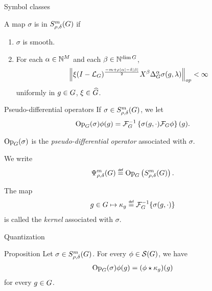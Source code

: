 \documentclass[handout]{beamer}
\begin{document}
\begin{frame}{Symbol classes}
    \begin{definition}
        A map $\sigma$ is in $S^{m}_{\rho, \delta}(G)$ if
        \begin{enumerate}
            \item
                $\sigma$ is smooth.
            \item
                For each $\alpha \in \mathbb{N}^M$ and each $\beta \in \mathbb{N}^{\dim G}$,
                \begin{align*}
                    \norm [op] {
                        \xi \BesselPotential {-m + \rho \abs \alpha - \delta \abs \beta}
                        \LeftDifferentialOperator \beta \DifferenceOperatorOrder \alpha \sigma(g, \lambda)
                    } < \infty
                \end{align*}
                uniformly in $g \in G$, $\xi \in {\widehat{G}}$.
        \end{enumerate}
    \end{definition}
\end{frame}

\begin{frame}{Pseudo-differential operators}
    If $\sigma \in S^{m}_{\rho, \delta}(G)$,
    we let
    \begin{align*}
        \mathrm{Op}_{G}(\sigma) \phi(g) = \mathcal{F}^{-1}_{G} \left\{ \sigma(g, \cdot) \mathcal{F}_{G} \phi \right\}(g).
    \end{align*}

    $\mathrm{Op}_{G}(\sigma)$ is the \emph{pseudo-differential operator} associated with $\sigma$.

    We write
    \begin{align*}
        \OperatorClass m {\rho, \delta} \defeq \Op \left(\SymbolClass m {\rho, \delta}\right).
    \end{align*}

    \pause

    The map
    \begin{align*}
        g \in \Group \mapsto \kappa_g \defeq \InverseFourier \{\sigma(g, \dummy)\}
    \end{align*}
    is called the \emph{kernel} associated with $\sigma$.
\end{frame}

\begin{frame}{Quantization}
    \begin{block}{Proposition}
        Let $\sigma \in S^{m}_{\rho, \delta}(G)$.
        For every $\phi \in {\mathcal{S} (G)}$,
        we have
        \begin{align*}
            \mathrm{Op}_{G}(\sigma) \phi(g) = (\phi \star \kappa_g)(g)
        \end{align*}
        for every $g \in G$.
    \end{block}
\end{frame}
\end{document}
